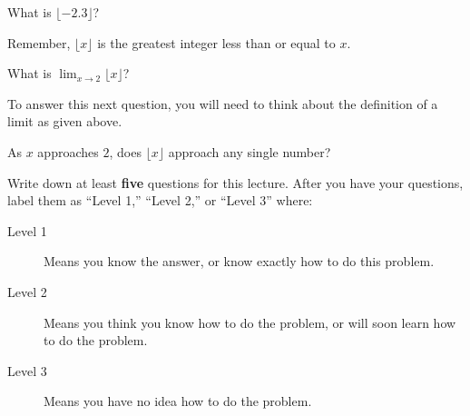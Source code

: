 \documentclass{ximera}
\begin{document}
\begin{image}
\end{image}

\begin{question}
What is $\lfloor -2.3\rfloor$?
\begin{hint}
Remember, $\lfloor x\rfloor$ is the greatest integer less than or
equal to $x$.
\end{hint}
\begin{multipleChoice}
\end{multipleChoice}
\end{question}



\begin{question}
What is $\lim_{x\to 2}\lfloor x\rfloor$?
\begin{hint}
To answer this next question, you will need to think about the
definition of a limit as given above.
\end{hint}
\begin{hint}
As $x$ approaches $2$, does $\lfloor x\rfloor$ approach any single number?
\end{hint}
\begin{multipleChoice}
\end{multipleChoice}
\end{question}


\begin{question}
Write down at least \textbf{five} questions for this lecture. After
you have your questions, label them as ``Level 1,'' ``Level 2,'' or ``Level 3'' where:
\begin{description}
\item[Level 1] Means you know the answer, or know exactly how to do this problem.
\item[Level 2] Means you think you know how to do the problem, or will soon learn how to do the problem.
\item[Level 3] Means you have no idea how to do the problem. 
\end{description}
\begin{freeResponse}
\end{freeResponse}
\end{question}
\end{document}
